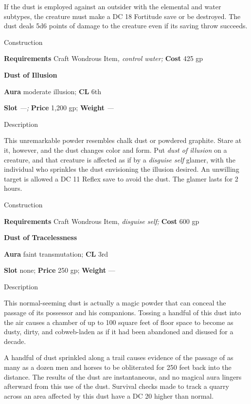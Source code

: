 If the dust is employed against an outsider with the elemental and water subtypes, the creature must make a DC 18 Fortitude save or be destroyed. The dust deals 5d6 points of damage to the creature even if its saving throw succeeds. 
				
Construction
				
\textbf{Requirements} Craft Wondrous Item\textit{, control water;}\textbf{ Cost }425 gp
				
\textbf{Dust of Illusion}
				
\textbf{Aura} moderate illusion; \textbf{CL} 6th
				
\textbf{Slot}\textit{ ---; }\textbf{Price} 1,200 gp; \textbf{Weight }\textit{---}
				
Description
				
This unremarkable powder resembles chalk dust or powdered graphite. Stare at it, however, and the dust changes color and form. Put \textit{dust of illusion }on a creature, and that creature is affected as if by a \textit{disguise self} glamer, with the individual who sprinkles the dust envisioning the illusion desired. An unwilling target is allowed a DC 11 Reflex save to avoid the dust. The glamer lasts for 2 hours. 
				
Construction
				
\textbf{Requirements} Craft Wondrous Item, \textit{disguise self;}\textbf{ Cost }600 gp
				
\textbf{Dust of Tracelessness}
				
\textbf{Aura} faint transmutation;\textbf{ CL }3rd
				
\textbf{Slot} none; \textbf{Price} 250 gp; \textbf{Weight }---
				
Description
				
This normal-seeming dust is actually a magic powder that can conceal the passage of its possessor and his companions. Tossing a handful of this dust into the air causes a chamber of up to 100 square feet of floor space to become as dusty, dirty, and cobweb-laden as if it had been abandoned and disused for a decade.
				
A handful of dust sprinkled along a trail causes evidence of the passage of as many as a dozen men and horses to be obliterated for 250 feet back into the distance. The results of the dust are instantaneous, and no magical aura lingers afterward from this use of the dust. Survival checks made to track a quarry across an area affected by this dust have a DC 20 higher than normal. 
				
